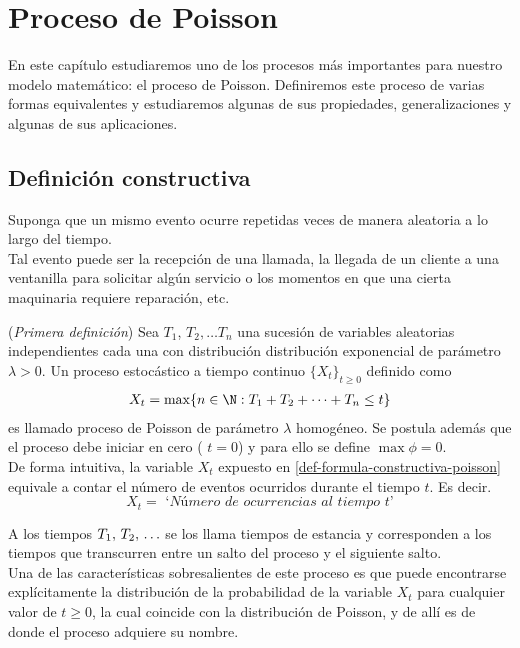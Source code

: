 \section{Proceso de Poisson}
\label{procPoisson-chapter}
En este capítulo estudiaremos uno de los procesos más importantes para nuestro modelo matemático: el proceso de Poisson. Definiremos este proceso de varias formas equivalentes y estudiaremos algunas de sus propiedades, generalizaciones y algunas de sus aplicaciones.
\subsection{Definición constructiva}
    Suponga que un mismo evento ocurre repetidas veces de manera aleatoria a lo largo del tiempo.\\
    Tal evento puede ser la recepción de una llamada, la llegada de un cliente a una ventanilla para solicitar algún servicio o los momentos en que una cierta maquinaria requiere reparación, etc.\\
    \begin{Def}(\textit{Primera definición})
        Sea $T_1$, $T_2, \ldots T_n$ una sucesión de variables aleatorias independientes cada una con distribución distribución exponencial de parámetro $\lambda>0$. Un proceso estocástico a tiempo continuo $\{X_t\}_{t\geq 0}$ definido como
        \begin{eqnarray}
            X_t = \max \{ n\in\N : T_1+T_2+\cdots+T_n \leq t\}
            \label{def-formula-constructiva-poisson}
        \end{eqnarray}
        es llamado proceso de Poisson de parámetro $\lambda$ homogéneo.
        Se postula además que el proceso debe iniciar en cero ( $t=0$) y para ello se define $\max \phi=0$.\\
        De forma intuitiva, la variable $X_t$ expuesto en \ref{def-formula-constructiva-poisson}  equivale a contar el número de eventos ocurridos durante el tiempo $t$. Es decir.
        $$X_t = \textit{ `Número de ocurrencias al tiempo $t$'}$$
        \label{def-procesoPoison-constructiva}
    \end{Def}
    A los tiempos $T_1 ,\thinspace T_2,\thinspace\ldots$ se los llama tiempos de estancia y corresponden a los tiempos que transcurren entre un salto del proceso y el siguiente salto.\\
    Una de las características sobresalientes de este proceso es que puede encontrarse explícitamente la distribución de la probabilidad de la variable $X_t$ para cualquier valor de $t\geq 0$, la cual coincide con la distribución de Poisson, y de allí es de donde el proceso adquiere su nombre.
